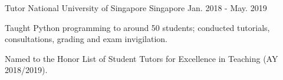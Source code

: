 
\begin{cventries}
  \cventry
    {Tutor}
    {National University of Singapore}
    {Singapore}
    {Jan. 2018 - May. 2019}
    {
      \begin{cvitems}
        \item {Taught Python programming to around 50 students; conducted tutorials, consultations, grading and exam invigilation.}
        \item {Named to the Honor List of Student Tutors for Excellence in Teaching (AY 2018/2019).}
      \end{cvitems}
    }
\end{cventries}
